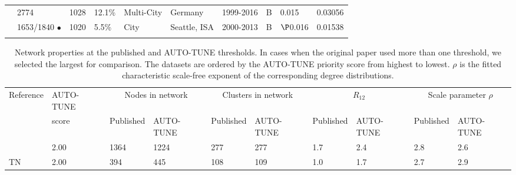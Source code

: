 \documentclass[utf8]{FrontiersinHarvard} %
\begin{document}
\begin{table}[h!]
\begin{ssmall}
\begin{tabular}{llllllllll}
			\cite{Stecher:2018aa}       & 2774                & 1028 & 12.1\% & Multi-City & Germany                  & 1999-2016 & B                     & 0.015                                        & 0.03056          \\
			\cite{chato_public_2020}    & 1653/1840 $\bullet$ & 1020 & 5.5\%  & City       & Seattle, ISA             & 2000-2013 & B                     & $\P$0.016                                    & 0.01538          \\
			\\

			\hline
		\end{tabular}
	\end{ssmall}
\end{table}

\begin{table}[h!]
	\caption{Network properties at the published and AUTO-TUNE thresholds. In cases when the original paper used more than one threshold, we selected the largest for comparison. The datasets are ordered by the AUTO-TUNE priority score from highest to lowest. $\rho$ is the fitted characteristic scale-free exponent of the corresponding degree distributions.}
	\label{tab:paperComparisonProp}
	\vspace{10pt}
	\centering
	\begin{ssmall}
		\begin{tabular}{llllllllll}
			\hline
			Reference                        & AUTO-TUNE & \multicolumn{2}{c}{Nodes in network} & \multicolumn{2}{c}{Clusters in network} & \multicolumn{2}{c}{$R_{12}$} & \multicolumn{2}{c}{Scale parameter $\rho$}                                                 \\
			                                 & score     & Published                            & AUTO-TUNE                               & Published                    & AUTO-TUNE                                  & Published & AUTO-TUNE & Published & AUTO-TUNE \\
			\hline
			\cite{Li:2022aa}                 & 2.00      & 1364                                 & 1224                                    & 277                          & 277                                        & 1.7       & 2.4       & 2.8       & 2.6       \\
			\cite{chato_public_2020} TN      & 2.00      & 394                                  & 445                                     & 108                          & 109                                        & 1.0       & 1.7       & 2.7       & 2.9       \\

\end{tabular}
\end{ssmall}
\end{table}
\end{document}
